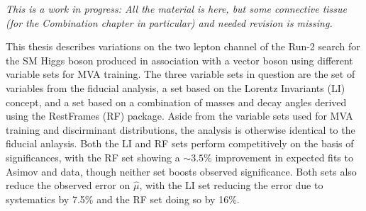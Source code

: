 



\emph{This is a work in progress:  All the material is here, but some connective tissue (for the Combination chapter in particular) and needed revision is missing.}

This thesis describes variations on the two lepton channel of the Run-2 search for the SM Higgs boson produced in association with a vector boson using different variable sets for MVA training.  
The three variable sets in question are the set of variables from the fiducial analysis, a set based on the Lorentz Invariants (LI) concept, and a set based on a combination of masses and decay angles derived using the RestFrames (RF) package.
Aside from the variable sets used for MVA training and discirminant distributions, the analysis is otherwise identical to the fiducial anlaysis. %
Both the LI and RF sets perform competitively on the basis of significances, with the RF set showing a $\sim3.5$\% improvement in expected fits to Asimov and data, though neither set boosts observed significance.
Both sets also reduce the observed error on $\hat{\mu}$, with the LI set reducing the error due to systematics by 7.5\% and the RF set doing so by 16\%.
